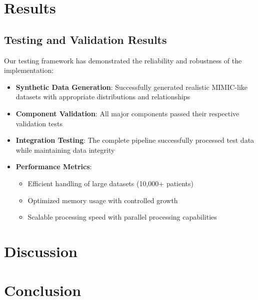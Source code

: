 \documentclass[12pt]{article}
\begin{document}
\section{Results}

\subsection{Testing and Validation Results}

Our testing framework has demonstrated the reliability and robustness of the implementation:

\begin{itemize}
    \item \textbf{Synthetic Data Generation}: Successfully generated realistic MIMIC-like datasets with appropriate distributions and relationships
    \item \textbf{Component Validation}: All major components passed their respective validation tests
    \item \textbf{Integration Testing}: The complete pipeline successfully processed test data while maintaining data integrity
    \item \textbf{Performance Metrics}:
    \begin{itemize}
        \item Efficient handling of large datasets (10,000+ patients)
        \item Optimized memory usage with controlled growth
        \item Scalable processing speed with parallel processing capabilities
    \end{itemize}
\end{itemize}

\section{Discussion}

\section{Conclusion}



\end{document}
